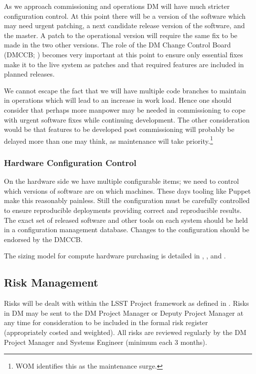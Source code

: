 As we approach commissioning and operations DM will have much stricter configuration control.
At this point there will be a version of the software which may need urgent patching, a next candidate release version of the software, and the master.
A patch to the operational version will require the same fix to be made in the two other versions.
The role of the DM Change Control Board (DMCCB; ) becomes very important at this point to ensure only essential fixes make it to the live system as patches and that required features are included in planned releases.

We cannot escape the fact that we  will have multiple code branches to maintain in operations which will lead to an increase in work load.
Hence one should consider that perhaps more manpower may be needed in commissioning to cope with urgent software fixes while continuing development.
The other consideration would be that features to be developed post commissioning will probably be delayed more than one may think, as maintenance will take priority.\footnote{WOM identifies this as the maintenance surge.}

\subsubsection{Hardware Configuration Control}

On the hardware side we have multiple configurable items; we need to control which versions of software are on which machines. These days tooling like Puppet make this reasonably painless. Still the configuration  must be carefully controlled to ensure reproducible deployments providing correct and reproducible results. The exact set of released software and other tools on each system should be held in a configuration management database.
Changes to the configuration should be endorsed by the DMCCB.

The sizing model for compute hardware purchasing is detailed in , , and .

\subsection {Risk Management } \label{sect:risk}

Risks will be dealt with within the LSST Project framework as defined in .
Risks in DM may be sent to the DM Project Manager or Deputy Project Manager at any time for consideration to be included in the formal risk register (appropriately costed and weighted). All risks are reviewed regularly by the DM Project Manager and Systems Engineer (minimum each 3 months).


